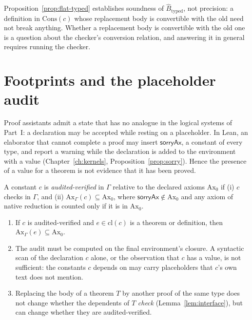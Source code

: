 \begin{remark}
Proposition~\ref{prop:flat-typed} establishes soundness of $\widehat B_{\mathrm{typed}}$, not precision: a definition in $\mathrm{Cons}(c)$ whose replacement body is convertible with the old need not break anything. Whether a replacement body is convertible with the old one is a question about the checker's conversion relation, and answering it in general requires running the checker.
\end{remark}

\section{Footprints and the placeholder audit}

Proof assistants admit a state that has no analogue in the logical systems of Part~I: a declaration may be accepted while resting on a placeholder. In Lean, an elaborator that cannot complete a proof may insert $\mathsf{sorryAx}$, a constant of every type, and report a warning while the declaration is added to the environment with a value (Chapter~\ref{ch:kernels}, Proposition~\ref{prop:sorry}). Hence the presence of a value for a theorem is not evidence that it has been proved.

\begin{definition}
\label{def:audited}
A constant $c$ is \emph{audited-verified} in $\Gamma$ relative to the declared axioms $\mathrm{Ax}_0$ if (i) $c$ checks in $\Gamma$, and (ii) $\mathrm{Ax}_\Gamma(c)\subseteq\mathrm{Ax}_0$, where $\mathsf{sorryAx}\notin\mathrm{Ax}_0$ and any axiom of native reduction is counted only if it is in $\mathrm{Ax}_0$.
\end{definition}

\begin{proposition}
\label{prop:audit}
\begin{enumerate}[label=(\alph*),nosep]
\item If $c$ is audited-verified and $e\in\mathrm{cl}(c)$ is a theorem or definition, then $\mathrm{Ax}_\Gamma(e)\subseteq\mathrm{Ax}_0$.
\item The audit must be computed on the final environment's closure. A syntactic scan of the declaration $c$ alone, or the observation that $c$ has a value, is not sufficient: the constants $c$ depends on may carry placeholders that $c$'s own text does not mention.
\item Replacing the body of a theorem $T$ by another proof of the same type does not change whether the dependents of $T$ \emph{check} (Lemma~\ref{lem:interface}), but can change whether they are audited-verified.
\end{enumerate}
\end{proposition}


